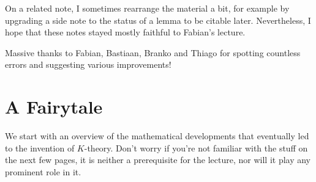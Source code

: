 	On a related note, I sometimes rearrange the material a bit, for example by upgrading a side note to the status of a lemma to be citable later. Nevertheless, I hope that these notes stayed mostly faithful to Fabian's lecture.
	
	Massive thanks to Fabian, Bastiaan, Branko and Thiago for spotting countless errors and suggesting various improvements!
	
	
	
	
	\section{A Fairytale}

	We start 
	with an overview of the mathematical developments that eventually led to the invention of $K$-theory. Don't worry if you're not familiar with the stuff on the next few pages, it is neither a prerequisite for the lecture, nor will it play any prominent role in it.
	
